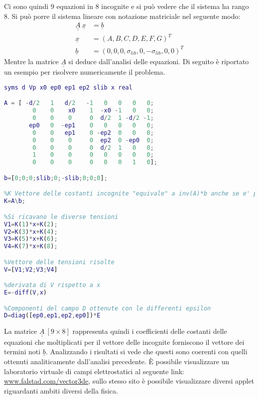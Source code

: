 Ci sono quindi 9 equazioni in 8 incognite e si può vedere che il sistema 
ha rango 8.
Si può porre il sistema lineare con notazione matriciale nel seguente modo:
\begin{align*}
\underline{\underline{A}}\ \underline{x} &= \underline{b}\\
\underline{x} &= \left(A,B,C,D,E,F,G\right)^T \\
\underline{b} &= \left(0,0,0,\sigma_{lib},0,-\sigma_{lib},0,0\right)^T 
\end{align*}
Mentre la matrice $\underline{\underline{A}}$ si deduce dall'analisi delle 
equazioni. 
\newpage
Di seguito è riportato un esempio per risolvere numericamente
il problema.
\begin{lstlisting}[style=Matlab-editor,language = Matlab]
syms d Vp x0 ep0 ep1 ep2 slib x real

A = [ -d/2   1   d/2   -1   0   0   0   0;
        0    0    x0    1  -x0 -1   0   0;
        0    0    0     0  d/2  1 -d/2 -1;
       ep0   0  -ep1    0   0   0   0   0;
        0    0   ep1    0 -ep2  0   0   0;
        0    0    0     0  ep2  0 -ep0  0;
        0    0    0     0  d/2  1   0   0;
        1    0    0     0   0   0   0   0;
        0    0    0     0   0   0   1   0];

b=[0;0;0;slib;0;-slib;0;0;0];

%K Vettore delle costanti incognite "equivale" a inv(A)*b anche se e' preferibile questa forma
K=A\b;

%Si ricavano le diverse tensioni
V1=K(1)*x+K(2);
V2=K(3)*x+K(4);
V3=K(5)*x+K(6);
V4=K(7)*x+K(8);

%Vettore delle tensioni risolte
V=[V1;V2;V3;V4] 

%derivata di V rispetto a x
E=-diff(V,x) 

%Componenti del campo D ottenute con le differenti epsilon
D=diag([ep0,ep1,ep2,ep0])*E 
\end{lstlisting}
La matrice $\underline{\underline{A}}\ [9\times 8]$ rappresenta quindi i coefficienti delle
costanti delle equazioni che moltiplicati per il vettore delle incognite
forniscono il vettore dei termini noti $\underline{b}$.
Analizzando i risultati si vede che questi sono coerenti con quelli ottenuti
analiticamente dall'analisi precedente.
È possibile visualizzare un laboratorio virtuale di campi elettrostatici al seguente link:
\href{http://falstad.com/vector3de/vector3de.html?f=InverseSquaredRadialDipole&d=equip&sl=y&p=1&a1=29&rx=92&ry=0&rz=-1&zm=1.2}{www.falstad.com/vector3de}, sullo stesso sito è possibile visualizzare diversi applet riguardanti ambiti
diversi della fisica.
